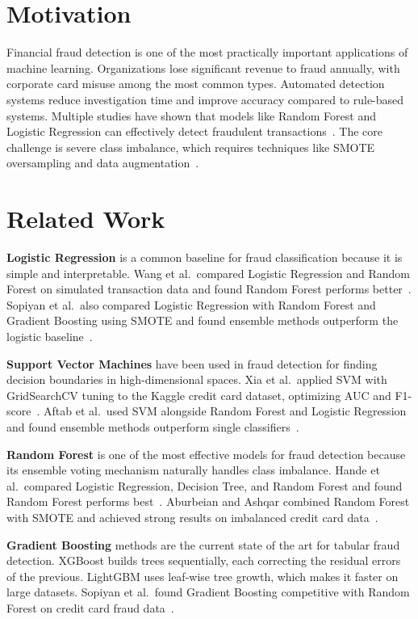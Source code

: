 \documentclass{article}
\begin{document}
\section{Motivation}

Financial fraud detection is one of the most practically important
applications of machine learning. Organizations lose significant revenue
to fraud annually, with corporate card misuse among the most common types.
Automated detection systems reduce investigation time and improve accuracy
compared to rule-based systems. Multiple studies have shown that models
like Random Forest and Logistic Regression can effectively detect
fraudulent transactions~\cite{wang2023credit,hande2019credit}. The core
challenge is severe class imbalance, which requires techniques like SMOTE
oversampling and data augmentation~\cite{khalid2024enhancing,strelcenia2023improving}.

\section{Related Work}

\textbf{Logistic Regression} is a common baseline for fraud
classification because it is simple and interpretable. Wang et al.\
compared Logistic Regression and Random Forest on simulated transaction
data and found Random Forest performs better~\cite{wang2023credit}.
Sopiyan et al.\ also compared Logistic Regression with Random Forest and
Gradient Boosting using SMOTE and found ensemble methods outperform the
logistic baseline~\cite{sopiyan2022fraud}.

\textbf{Support Vector Machines} have been used in fraud detection for
finding decision boundaries in high-dimensional spaces. Xia et al.\
applied SVM with GridSearchCV tuning to the Kaggle credit card dataset,
optimizing AUC and F1-score~\cite{xia2022credit}. Aftab et al.\ used SVM
alongside Random Forest and Logistic Regression and found ensemble methods
outperform single classifiers~\cite{aftab2023fraud}.

\textbf{Random Forest} is one of the most effective models for fraud
detection because its ensemble voting mechanism naturally handles class
imbalance. Hande et al.\ compared Logistic Regression, Decision Tree, and
Random Forest and found Random Forest performs best~\cite{hande2019credit}.
Aburbeian and Ashqar combined Random Forest with SMOTE and achieved strong
results on imbalanced credit card data~\cite{aburbeian2023credit}.

\textbf{Gradient Boosting} methods are the current state of the art for
tabular fraud detection. XGBoost builds trees sequentially, each
correcting the residual errors of the previous. LightGBM uses leaf-wise
tree growth, which makes it faster on large datasets. Sopiyan et al.\
found Gradient Boosting competitive with Random Forest on credit card
fraud data~\cite{sopiyan2022fraud}.
\end{document}
